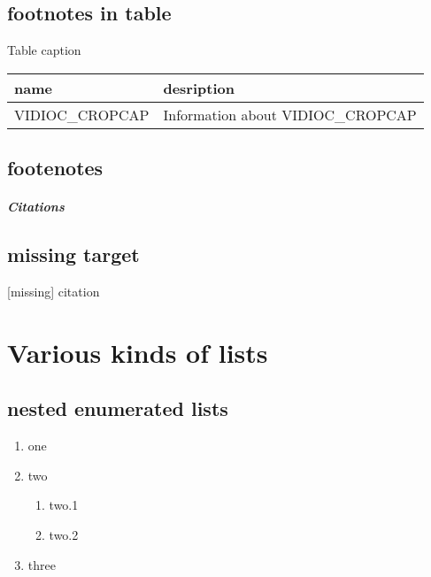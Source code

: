 \documentclass[letterpaper,10pt,english]{sphinxmanual}
\begin{document}
\section{footnotes in table}
\label{footnote:footnotes-in-table}

\begin{threeparttable}
\capstart\caption{Table caption \protect\footnotemark[4]}\label{footnote:id12}
\begin{tabulary}{\linewidth}{|L|L|}
\hline
\textsf{\relax 
name \protect\footnotemark[5]
} & \textsf{\relax 
desription
}\\
\hline
VIDIOC\_CROPCAP
 & 
Information about VIDIOC\_CROPCAP
\\
\hline\end{tabulary}

\end{threeparttable}


\section{footenotes}
\label{footnote:footenotes}\paragraph{Citations}


\section{missing target}
\label{footnote:missing-target}
{[}missing{]} citation


\chapter{Various kinds of lists}
\label{lists::doc}\label{lists:various-kinds-of-lists}

\section{nested enumerated lists}
\label{lists:nested-enumerated-lists}\begin{enumerate}
\item {} 
one

\item {} 
two
\begin{enumerate}
\item {} 
two.1

\item {} 
two.2

\end{enumerate}

\item {} 
three

\end{enumerate}
\end{document}
